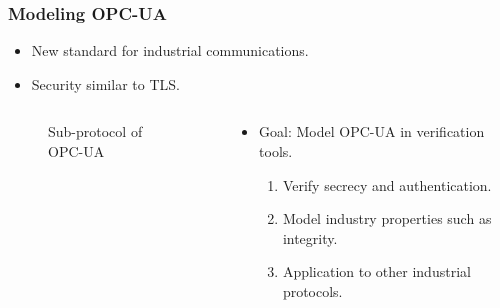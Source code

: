 \documentclass{beamer}
\newcommand{\opcua}{OPC-UA\xspace}
\begin{document}
\begin{frame}
    \frametitle{Modeling \opcua}

    \begin{itemize}
        \item New standard for industrial communications.
        \item Security similar to TLS\cite{DR08}.
    \end{itemize}
    \begin{columns}
        \begin{column}{.5\textwidth}
            \begin{figure}[htb]
                \caption{Sub-protocol of \opcua}
            \end{figure}
        \end{column}
        \begin{column}{.5\textwidth}
            \begin{itemize}
                \item Goal: Model \opcua in verification tools.
                \begin{enumerate}
                    \item Verify secrecy and authentication.
                    \item Model industry properties such as integrity.
                    \item Application to other industrial protocols.
                \end{enumerate}
            \end{itemize}
        \end{column}
    \end{columns}
\end{frame}
\end{document}
